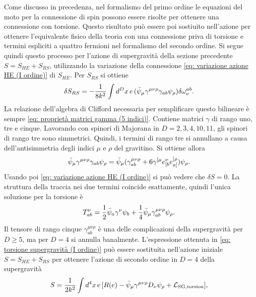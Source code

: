 Come discusso in precedenza, nel formalismo del primo ordine le equazioni del moto per la connessione di spin possono essere risolte per ottenere una connessione con torsione. Questo risultato può essere poi sostiuito nell'azione per ottenere l'equivalente fisico della teoria con una connessione priva di torsione e termini espliciti a quattro fermioni nel formalismo del secondo ordine. Si segue quindi questo processo per l'azione di supergravità della sezione precedente $S = S_{HE} + S_{RS}$, utilizzando la variazione della connessione \eqref{eq: variazione azione HE (I ordine)} di $S_{HE}$. Per $S_{RS}$ si ottiene 
\begin{equation}
    \delta S_{RS} = -\frac{1}{8k^2}\int d^Dx\,e\,(\bar{\psi}_\mu\gamma^{\mu\nu\rho}\gamma_{ab}\psi_\rho)\delta\omega^{ab}_\nu.
\end{equation}
La relazione dell'algebra di Clifford necessaria per semplificare questo bilineare è sempre \eqref{eq: proprietà matrici gamma (5 indici)}. Contiene matrici $\gamma$ di rango uno, tre e cinque. Lavorando con spinori di Majorana in $D = 2,3,4,10,11$, gli spinori di rango tre sono simmetrici. Quindi, i termini di rango tre si annullano a causa dell'antisimmetria degli indici $\mu$ e $\rho$ del gravitino. Si ottiene allora 
\begin{equation}
    \bar{\psi}_\mu\gamma^{\mu\nu\rho}\gamma_{ab}\psi_\rho = \bar{\psi}_\mu(\gamma^{\mu\nu\rho}_{ab} + 6\gamma^{[\mu}e^\nu_{[b}e^{[\rho}_{a]})\psi_\rho.
\end{equation}
Usando poi \eqref{eq: variazione azione HE (I ordine)} si può vedere che $\delta S = 0$. La struttura della traccia nei due termini coincide esattamente, quindi l'unica soluzione per la torsione è 
\begin{equation}
\label{eq: torsione supergravità (I ordine)}
    T^\nu_{ab} = \frac{1}{2}\bar{\psi}_a\gamma^\nu\psi_b + \frac{1}{4}\bar{\psi}_\mu\gamma^{\mu\nu\rho}_{ab}\psi_\rho. 
\end{equation}
Il tensore di rango cinque $\gamma^{\mu\nu\rho}_{ab}$ è una delle complicazioni della supergravità per $D \ge 5$, ma per $D = 4$ si annulla banalmente. L'espressione ottenuta in \eqref{eq: torsione supergravità (I ordine)} può essere sostituita nell'azione iniziale $S = S_{HE} + S_{RS}$ per ottenere l'azione di secondo ordine in $D = 4$ della supergravità
\begin{equation}
\label{eq: azione SG di secondo ordine in D = 4}
    S = \frac{1}{2k^2}\int d^4x\,e\,[R(e) - \bar{\psi}_\mu\gamma^{\mu\nu\rho}D_\nu\psi_\rho + \mathcal{L}_{\mathrm{SG},\mathrm{torsion}}],
\end{equation}
